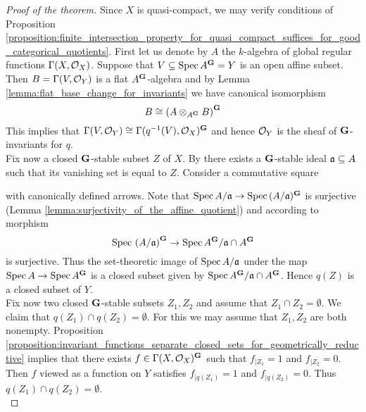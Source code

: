 \begin{proof}[Proof of the theorem]
Since $X$ is quasi-compact, we may verify conditions of Proposition \ref{proposition:finite_intersection_property_for_quasi_compact_suffices_for_good_categorical_quotients}. First let us denote by $A$ the $k$-algebra of global regular functions $\Gamma(X,{\mathcal O}_X)$. Suppose that $V \subseteq \mathrm{Spec}\, A^{\mathbf{G}} = Y$ is an open affine subset. Then $B = \Gamma(V,{\mathcal O}_Y)$ is a flat $A^{\mathbf{G}}$-algebra and by Lemma \ref{lemma:flat_base_change_for_invariants}  we have canonical isomorphism
$$B \cong \left(A\otimes_{A^{\mathbf{G}}}B\right)^{\mathbf{G}}$$
This implies that $\Gamma(V,{\mathcal O}_Y) \cong \Gamma(q^{-1}(V),{\mathcal O}_X)^{\mathbf{G}}$ and hence ${\mathcal O}_Y$ is the sheaf of $\mathbf{G}$-invariants for $q$.\\
Fix now a closed $\mathbf{G}$-stable subset $Z$ of $X$. By {\cite[Corollary 5.4]{Algebraic_groups}} there exists a $\mathbf{G}$-stable ideal $\mathfrak{a}\subseteq A$ such that its vanishing set is equal to $Z$. Consider a commutative square
\begin{center}
\end{center}
with canonically defined arrows. Note that $\mathrm{Spec}\, A/\mathfrak{a} \rightarrow \mathrm{Spec}\, (A/\mathfrak{a})^{\mathbf{G}}$ is surjective (Lemma \ref{lemma:surjectivity_of_the_affine_quotient}) and according to {\cite[Theorem 2.4]{Geometrically_reductive_and_Nagata}} morphism
$$\mathrm{Spec}\, \left(A/\mathfrak{a}\right)^{\mathbf{G}}\rightarrow \mathrm{Spec}\, A^{\mathbf{G}}/\mathfrak{a}\cap A^{\mathbf{G}}$$
is surjective. Thus the set-theoretic image of $\mathrm{Spec}\, A/\mathfrak{a}$ under the map $\mathrm{Spec}\, A\rightarrow \mathrm{Spec}\, A^{\mathbf{G}}$ is a closed subset given by $\mathrm{Spec}\, A^{\mathbf{G}}/\mathfrak{a}\cap A^{\mathbf{G}}$. Hence $q(Z)$ is a closed subset of $Y$.\\
Fix now two closed $\mathbf{G}$-stable subsets $Z_1,Z_2$ and assume that $Z_1\cap Z_2 = \emptyset$. We claim that $q(Z_1) \cap q(Z_2) = \emptyset$. For this we may assume that $Z_1,Z_2$ are both nonempty. Proposition \ref{proposition:invariant_functions_separate_closed_sets_for_geometrically_reductive} implies that there exists $f \in \Gamma(X,{\mathcal O}_X)^{\mathbf{G}}$ such that $f_{\mid Z_1} = 1$ and $f_{\mid Z_2} = 0$. Then $f$ viewed as a function on $Y$ satisfies $f_{\mid q(Z_1)} = 1$ and $f_{\mid q(Z_2)} = 0$. Thus $q(Z_1)\cap q(Z_2) = \emptyset$.\\

\end{proof}
